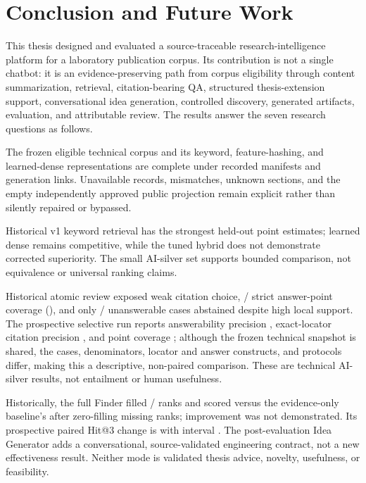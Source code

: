 \chapter{Conclusion and Future Work}
\label{ch:conclusion}

This thesis designed and evaluated a source-traceable research-intelligence platform for a laboratory publication corpus. Its contribution is not a single chatbot: it is an evidence-preserving path from corpus eligibility through content summarization, retrieval, citation-bearing QA, structured thesis-extension support, conversational idea generation, controlled discovery, generated artifacts, evaluation, and attributable review. The results answer the seven research questions as follows.

\begin{description}[leftmargin=16mm,style=multiline]
  \item[RQ1] The frozen eligible technical corpus and its keyword, feature-hashing, and learned-dense representations are complete under recorded manifests and generation links. Unavailable records, mismatches, unknown sections, and the empty independently approved public projection remain explicit rather than silently repaired or bypassed.
  \item[RQ2] Historical v1 keyword retrieval has the strongest held-out point estimates; learned dense remains competitive, while the tuned hybrid does not demonstrate corrected superiority. The small AI-silver set supports bounded comparison, not equivalence or universal ranking claims.
  \item[RQ3] Historical atomic review exposed weak citation choice, \QaCoveredAnswerPointCount{}/\QaAnswerPointCount{} strict answer-point coverage (\QaAnswerPointCoverage{}), and only \QaUnanswerableAbstentionCount{}/\QaUnanswerableCaseCount{} unanswerable cases abstained despite high local support. The prospective selective run reports answerability precision \VTwoQAAnswerabilityPrecision{}, exact-locator citation precision \VTwoQACitationLocatorPrecision{}, and point coverage \VTwoQAAnswerPointCoverage{}; although the frozen technical snapshot is shared, the cases, denominators, locator and answer constructs, and protocols differ, making this a descriptive, non-paired comparison. These are technical AI-silver results, not entailment or human usefulness.
  \item[RQ4] Historically, the full Finder filled \RecommendationFullReturnedCount{}/\RecommendationRequestedSlotCount{} ranks and scored \RecommendationFullRelevance{} versus the evidence-only baseline's \RecommendationEvidenceRelevance{} after zero-filling missing ranks; improvement was not demonstrated. Its prospective paired Hit@3 change is \VTwoFinderHitAtThreeDelta{} with interval \VTwoFinderHitAtThreeDeltaCi{}. The post-evaluation Idea Generator adds a conversational, source-validated engineering contract, not a new effectiveness result. Neither mode is validated thesis advice, novelty, usefulness, or feasibility.

\end{description}
